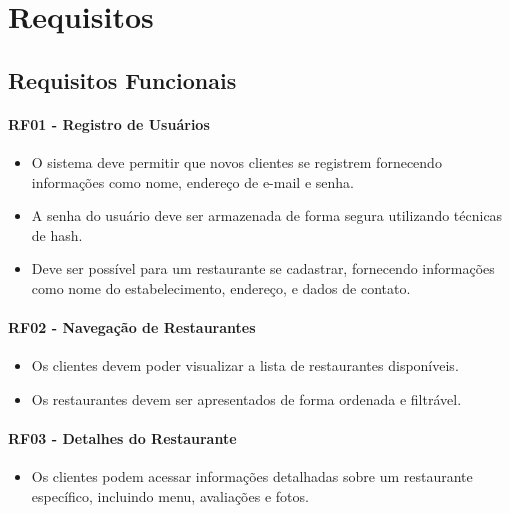 \chapter{Requisitos} \label{cap:requisitos}



\section{Requisitos Funcionais}

\subsubsection*{RF01 - Registro de Usuários}
\begin{itemize}
    \item O sistema deve permitir que novos clientes se registrem fornecendo informações como nome, endereço de e-mail e senha.
    \item A senha do usuário deve ser armazenada de forma segura utilizando técnicas de hash.
    \item Deve ser possível para um restaurante se cadastrar, fornecendo informações como nome do estabelecimento, endereço, e dados de contato.
\end{itemize}

\subsubsection*{RF02 - Navegação de Restaurantes}
\begin{itemize}
    \item Os clientes devem poder visualizar a lista de restaurantes disponíveis.
    \item Os restaurantes devem ser apresentados de forma ordenada e filtrável.
\end{itemize}

\subsubsection*{RF03 - Detalhes do Restaurante}
\begin{itemize}
    \item Os clientes podem acessar informações detalhadas sobre um restaurante específico, incluindo menu, avaliações e fotos.
\end{itemize}

